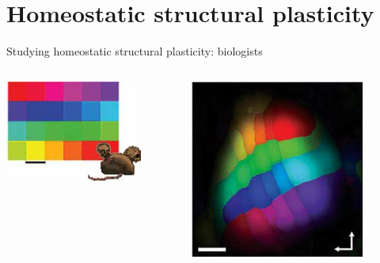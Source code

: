 \section{Homeostatic structural plasticity}
\begin{frame}[c]{Studying homeostatic structural plasticity: biologists}
  \begin{columns}
    \begin{column}{0.5\textwidth}
      \centering
      \includegraphics[width=0.8\textwidth]{99_images/keck-1-1a}%
    \end{column}
    \begin{column}{0.5\textwidth}
      \centering
      \includegraphics[width=0.8\textwidth]{99_images/keck-1-1c}%
    \end{column}
  \end{columns}
\end{frame}

